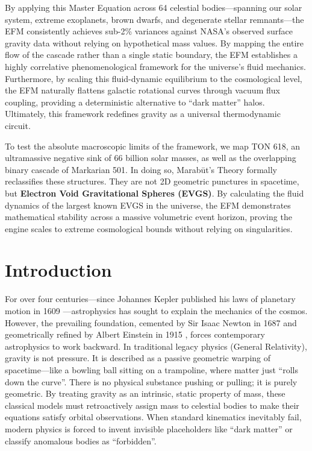 \documentclass[11pt, a4paper]{article}
\begin{document}
  By applying this Master Equation across 64 celestial bodies---spanning our solar system, extreme exoplanets, brown dwarfs, and degenerate stellar remnants---the EFM consistently achieves sub-2\% variances against NASA's observed surface gravity data \cite{nasa2024} without relying on hypothetical mass values. By mapping the entire flow of the cascade rather than a single static boundary, the EFM establishes a highly correlative phenomenological framework for the universe's fluid mechanics. Furthermore, by scaling this fluid-dynamic equilibrium to the cosmological level, the EFM naturally flattens galactic rotational curves through vacuum flux coupling, providing a deterministic alternative to ``dark matter'' halos. Ultimately, this framework redefines gravity as a universal thermodynamic circuit.

  To test the absolute macroscopic limits of the framework, we map TON 618, an ultramassive negative sink of 66 billion solar masses, as well as the overlapping binary cascade of Markarian 501. In doing so, Marab\={u}t's Theory formally reclassifies these structures. They are not 2D geometric punctures in spacetime, but \textbf{Electron Void Gravitational Spheres (EVGS)}. By calculating the fluid dynamics of the largest known EVGS in the universe, the EFM demonstrates mathematical stability across a massive volumetric event horizon, proving the engine scales to extreme cosmological bounds without relying on singularities.
\endgroup

\clearpage
\makeatletter
\renewcommand*\l@subsection{\@dottedtocline{2}{1.5em}{3.2em}} %
\makeatother
\tableofcontents
\clearpage

\section{Introduction}
  For over four centuries---since Johannes Kepler published his laws of planetary motion in 1609 \cite{kepler1609}---astrophysics has sought to explain the mechanics of the cosmos. However, the prevailing foundation, cemented by Sir Isaac Newton in 1687 \cite{newton1687} and geometrically refined by Albert Einstein in 1915 \cite{einstein1915}, forces contemporary astrophysics to work backward. In traditional legacy physics (General Relativity), gravity is not pressure. It is described as a passive geometric warping of spacetime---like a bowling ball sitting on a trampoline, where matter just ``rolls down the curve''. There is no physical substance pushing or pulling; it is purely geometric. By treating gravity as an intrinsic, static property of mass, these classical models must retroactively assign mass to celestial bodies to make their equations satisfy orbital observations. When standard kinematics inevitably fail, modern physics is forced to invent invisible placeholders like ``dark matter'' or classify anomalous bodies as ``forbidden''.
\end{document}

